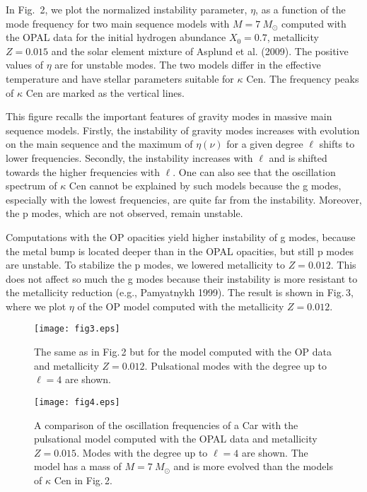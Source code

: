 \documentclass{ptapap}
\begin{document}
In Fig.\, 2, we plot the normalized instability parameter, $\eta$, as a function of the mode frequency
for two main sequence models with $M=7~M_\odot$ computed with the OPAL data for the initial hydrogen abundance $X_0=0.7$,
metallicity $Z=0.015$ and the solar element mixture of Asplund et al. (2009). The positive values of $\eta$ are for unstable modes.
The two models differ in the effective temperature and have stellar parameters suitable for $\kappa$ Cen.
The frequency peaks of $\kappa$ Cen are marked as the vertical lines.

This figure recalls the important features of gravity modes in massive main sequence models.
Firstly, the instability of gravity modes increases with evolution on the main sequence
and the maximum of $\eta(\nu)$ for a given degree $\ell$ shifts to lower frequencies.
Secondly, the instability increases with $\ell$ and is shifted towards
the higher frequencies with $\ell$.
One can also see that the oscillation spectrum of $\kappa$ Cen cannot be explained by such models
because the g modes, especially with the lowest frequencies, are quite far from the instability.
Moreover, the p modes, which are not observed, remain unstable.

Computations with the OP opacities yield higher instability of g modes,
because the metal bump is located deeper than in the OPAL opacities, but still p modes are unstable.
To stabilize the p modes, we lowered metallicity to $Z=0.012$. This does not affect so much the g modes
because their instability is more resistant to the metallicity reduction (e.g., Pamyatnykh 1999).
The result is shown in Fig.\,3, where we plot $\eta$ of the OP model computed with the metallicity $Z=0.012$.
\begin{figure}[h]
  \centering
\begin{minipage}{0.48\textwidth}
    \texttt{[image: fig3.eps]}
    \caption{The same as in Fig.\,2 but for the model computed with the OP data and metallicity $Z=0.012$. Pulsational modes with the degree up to $\ell=4$ are shown.}
    \label{fig:fig3}
  \end{minipage}
  \quad
  \begin{minipage}{0.48\textwidth}
    \texttt{[image: fig4.eps]}
    \caption{A comparison of the oscillation frequencies of a Car with the pulsational model computed with the OPAL data and metallicity $Z=0.015$. Modes with the degree up to $\ell=4$ are
    shown. The model has a mass of $M=7~M_\odot$ and is more evolved than the models of $\kappa$ Cen in Fig.\,2.}
    \label{fig:fig4}
  \end{minipage}
\end{figure}
\end{document}
